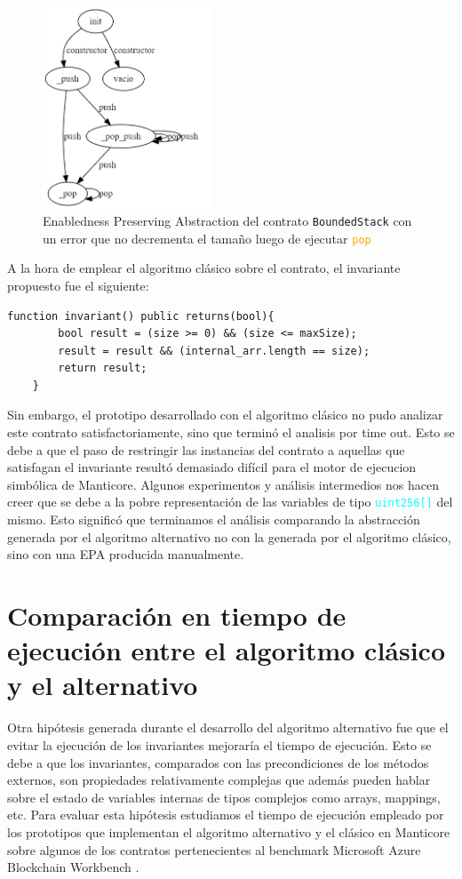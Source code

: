 \begin{figure}[H]
    \centering
    \includegraphics[width=0.45\textwidth]{figs/buggy-bounded-stack-epa.png}
    \caption{Enabledness Preserving Abstraction del contrato \texttt{BoundedStack} con un error que no decrementa el tamaño luego de ejecutar \textcolor{orange}{\texttt{pop}} }
    \label{fig:buggy-bounded-stack-epa}
\end{figure}

A la hora de emplear el algoritmo clásico sobre el contrato, el invariante propuesto fue el siguiente:
\begin{lstlisting}[language=Solidity]
    function invariant() public returns(bool){
        bool result = (size >= 0) && (size <= maxSize);
        result = result && (internal_arr.length == size);
        return result;
    }
\end{lstlisting}

Sin embargo, el prototipo desarrollado con el algoritmo clásico no pudo analizar este contrato satisfactoriamente, sino que terminó el analisis por time out.
Esto se debe a que el paso de restringir las instancias del contrato a aquellas que satisfagan el invariante resultó demasiado difícil para el motor de ejecucion simbólica de Manticore.
Algunos experimentos y análisis intermedios nos hacen creer que se debe a la pobre representación de las variables de tipo \textcolor{cyan}{\texttt{uint256[]}} del mismo.
Esto significó que terminamos el análisis comparando la abstracción generada por el algoritmo alternativo no con la generada por el algoritmo clásico, sino con una EPA producida manualmente.

\section{Comparación en tiempo de ejecución entre el algoritmo clásico y el alternativo}
Otra hipótesis generada durante el desarrollo del algoritmo alternativo fue que el evitar la ejecución de los invariantes mejoraría el tiempo de ejecución.
Esto se debe a que los invariantes, comparados con las precondiciones de los métodos externos, son propiedades relativamente complejas que además pueden hablar sobre el estado de variables internas de tipos complejos como arrays, mappings, etc.
Para evaluar esta hipótesis estudiamos el tiempo de ejecución empleado por los prototipos que implementan el algoritmo alternativo y el clásico en Manticore sobre algunos de los contratos pertenecientes al benchmark Microsoft Azure Blockchain Workbench \cite{azure-benchmark}.

